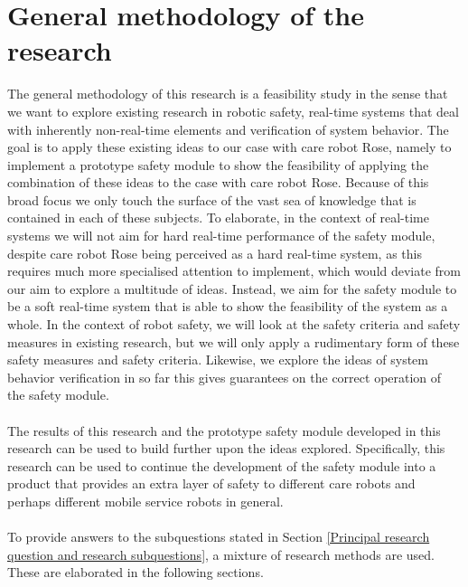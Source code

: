 \documentclass[12pt]{scrreprt}
\begin{document}
\section{General methodology of the research}
\label{General methodology of the research}
The general methodology of this research is a feasibility study in the sense that we want to explore existing research in robotic safety, real-time systems that deal with inherently non-real-time elements and verification of system behavior. The goal is to apply these existing ideas to our case with care robot Rose, namely to implement a prototype safety module to show the feasibility of applying the combination of these ideas to the case with care robot Rose. Because of this broad focus we only touch the surface of the vast sea of knowledge that is contained in each of these subjects. To elaborate, in the context of real-time systems we will not aim for hard real-time performance of the safety module, despite care robot Rose being perceived as a hard real-time system, as this requires much more specialised attention to implement, which would deviate from our aim to explore a multitude of ideas. Instead, we aim for the safety module to be a soft real-time system that is able to show the feasibility of the system as a whole. In the context of robot safety, we will look at the safety criteria and safety measures in existing research, but we will only apply a rudimentary form of these safety measures and safety criteria. Likewise, we explore the ideas of system behavior verification in so far this gives guarantees on the correct operation of the safety module.
\\\\
The results of this research and the prototype safety module developed in this research can be used to build further upon the ideas explored. Specifically, this research can be used to continue the development of the safety module into a product that provides an extra layer of safety to different care robots and perhaps different mobile service robots in general.%
\\\\
To provide answers to the subquestions stated in Section \ref{Principal research question and research subquestions}, a mixture of research methods are used. These are elaborated in the following sections.

\end{document}
